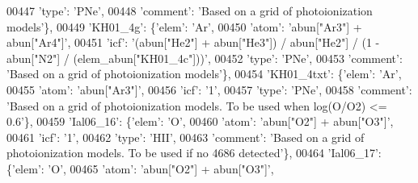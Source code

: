 \begin{DoxyCode}
00447                                      \textcolor{stringliteral}{'type'}: \textcolor{stringliteral}{'PNe'},
00448                                      \textcolor{stringliteral}{'comment'}: \textcolor{stringliteral}{'Based on a grid of photoionization models'}\},
00449                          \textcolor{stringliteral}{'KH01\_4g'}: \{\textcolor{stringliteral}{'elem'}: \textcolor{stringliteral}{'Ar'},
00450                                      \textcolor{stringliteral}{'atom'}: \textcolor{stringliteral}{'abun["Ar3"] + abun["Ar4"]'},
00451                                      \textcolor{stringliteral}{'icf'}: \textcolor{stringliteral}{'(abun["He2"] + abun["He3"]) / abun["He2"] / (1 -  abun["N2"] /
       (elem\_abun["KH01\_4c"]))'},
00452                                      \textcolor{stringliteral}{'type'}: \textcolor{stringliteral}{'PNe'},
00453                                      \textcolor{stringliteral}{'comment'}: \textcolor{stringliteral}{'Based on a grid of photoionization models'}\},
00454                          \textcolor{stringliteral}{'KH01\_4txt'}: \{\textcolor{stringliteral}{'elem'}: \textcolor{stringliteral}{'Ar'},
00455                                      \textcolor{stringliteral}{'atom'}: \textcolor{stringliteral}{'abun["Ar3"]'},
00456                                      \textcolor{stringliteral}{'icf'}: \textcolor{stringliteral}{'1'},
00457                                      \textcolor{stringliteral}{'type'}: \textcolor{stringliteral}{'PNe'},
00458                                      \textcolor{stringliteral}{'comment'}: \textcolor{stringliteral}{'Based on a grid of photoionization models. To be used when
       log(O/O2) <= 0.6'}\},
00459                          \textcolor{stringliteral}{'Ial06\_16'}: \{\textcolor{stringliteral}{'elem'}: \textcolor{stringliteral}{'O'},
00460                                       \textcolor{stringliteral}{'atom'}: \textcolor{stringliteral}{'abun["O2"] + abun["O3"]'},
00461                                       \textcolor{stringliteral}{'icf'}: \textcolor{stringliteral}{'1'},
00462                                       \textcolor{stringliteral}{'type'}: \textcolor{stringliteral}{'HII'},
00463                                       \textcolor{stringliteral}{'comment'}: \textcolor{stringliteral}{'Based on a grid of photoionization models. To be used if
       no 4686 detected'}\},
00464                          \textcolor{stringliteral}{'Ial06\_17'}: \{\textcolor{stringliteral}{'elem'}: \textcolor{stringliteral}{'O'},
00465                                       \textcolor{stringliteral}{'atom'}: \textcolor{stringliteral}{'abun["O2"] + abun["O3"]'},

\end{DoxyCode}
